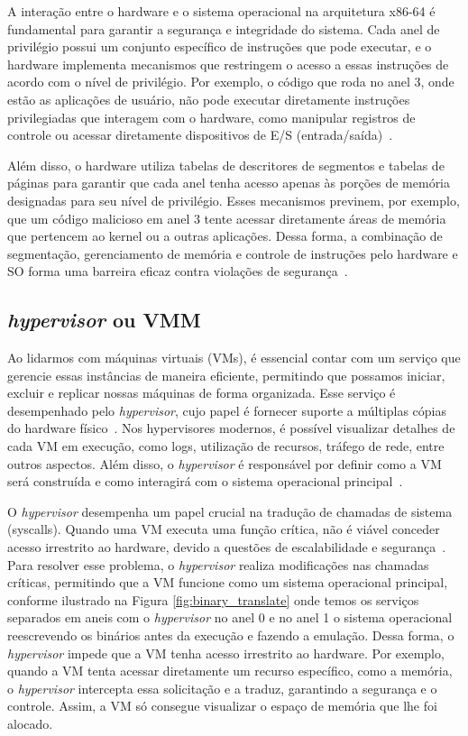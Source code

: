 A interação entre o hardware e o sistema operacional na arquitetura x86-64 é fundamental para garantir a segurança e integridade do sistema. Cada anel de privilégio possui um conjunto específico de instruções que pode executar, e o hardware implementa mecanismos que restringem o acesso a essas instruções de acordo com o nível de privilégio. Por exemplo, o código que roda no anel 3, onde estão as aplicações de usuário, não pode executar diretamente instruções privilegiadas que interagem com o hardware, como manipular registros de controle ou acessar diretamente dispositivos de E/S (entrada/saída)~\citep{chirammal2016mastering}. 

Além disso, o hardware utiliza tabelas de descritores de segmentos e tabelas de páginas para garantir que cada anel tenha acesso apenas às porções de memória designadas para seu nível de privilégio. Esses mecanismos previnem, por exemplo, que um código malicioso em anel 3 tente acessar diretamente áreas de memória que pertencem ao kernel ou a outras aplicações. Dessa forma, a combinação de segmentação, gerenciamento de memória e controle de instruções pelo hardware e SO forma uma barreira eficaz contra violações de segurança~\citep{chirammal2016mastering}.



\subsection{\textit{hypervisor} ou VMM}

Ao lidarmos com máquinas virtuais (VMs), é essencial contar com um serviço que gerencie essas instâncias de maneira eficiente, permitindo que possamos iniciar, excluir e replicar nossas máquinas de forma organizada. Esse serviço é desempenhado pelo \textit{hypervisor}, cujo papel é fornecer suporte a múltiplas cópias do hardware físico~\citep{modernOS}. Nos hypervisores modernos, é possível visualizar detalhes de cada VM em execução, como logs, utilização de recursos, tráfego de rede, entre outros aspectos. Além disso, o \textit{hypervisor} é responsável por definir como a VM será construída e como interagirá com o sistema operacional principal~\citep{chirammal2016mastering}.

O \textit{hypervisor} desempenha um papel crucial na tradução de chamadas de sistema (syscalls). Quando uma VM executa uma função crítica, não é viável conceder acesso irrestrito ao hardware, devido a questões de escalabilidade e segurança~\citep{modernOS}. Para resolver esse problema, o \textit{hypervisor} realiza modificações nas chamadas críticas, permitindo que a VM funcione como um sistema operacional principal, conforme ilustrado na Figura \ref{fig:binary_translate} onde temos os serviços separados em aneis com o \textit{hypervisor} no anel 0 e no anel 1 o sistema operacional reescrevendo os binários antes da execução e fazendo a emulação. Dessa forma, o \textit{hypervisor} impede que a VM tenha acesso irrestrito ao hardware. Por exemplo, quando a VM tenta acessar diretamente um recurso específico, como a memória, o \textit{hypervisor} intercepta essa solicitação e a traduz, garantindo a segurança e o controle. Assim, a VM só consegue visualizar o espaço de memória que lhe foi alocado.

